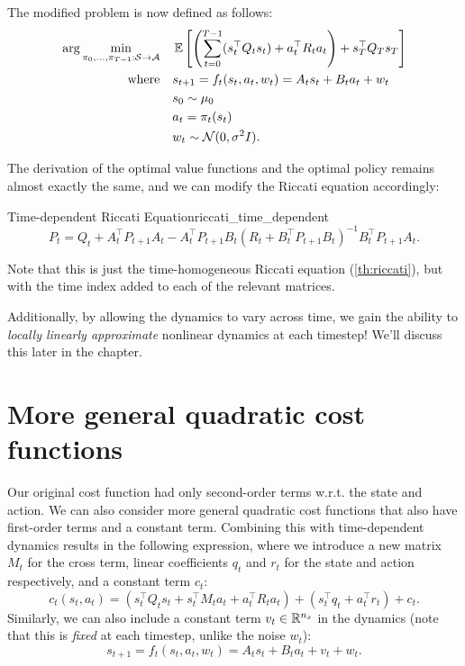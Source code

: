 \documentclass[../main/main]{subfiles}
\begin{document}
The modified problem is now defined as follows:
\begin{align*}
    \arg \min_{\pi_{0}, \dots, \pi_{T-1} : \mathcal{S} \to \mathcal{A}} \quad & \operatorname*{\mathbb{E}} \left[ \left( \sum_{t=0}^{T-1} (s_t^\top Q_t s_t) + a_t^\top R_t a_t \right) + s_T^\top Q_T s_T \right] \\
    \textrm{where} \quad & s_{t+1} = f_t(s_t, a_t, w_t) = A_t s_t + B_t a_t + w_t \\
    & s_0 \sim \mu_0 \\
    & a_t = \pi_t (s_t) \\
    & w_t \sim \mathcal{N}(0, \sigma^2 I).
\end{align*}

The derivation of the optimal value functions and the optimal policy remains almost exactly the same,
and we can modify the Riccati equation accordingly:

\begin{theorem}{Time-dependent Riccati Equation}{riccati_time_dependent}
    \[
        P_t = Q_t + A_t^\top P_{t+1} A_t - A_t^\top P_{t+1} B_t (R_t + B_t^\top P_{t+1} B_t)^{-1} B_t^\top P_{t+1} A_t.
    \]

    \noindent
    Note that this is just the time-homogeneous Riccati equation (\autoref{th:riccati}), but with the
    time index added to each of the relevant matrices.
\end{theorem}

Additionally, by allowing the dynamics to vary across time,
we gain the ability to \emph{locally linearly approximate} nonlinear dynamics at each timestep!
We'll discuss this later in the chapter.

\section{More general quadratic cost functions}

Our original cost function had only second-order terms w.r.t. the state and action. We can also consider more general quadratic cost functions that also have first-order terms and a constant term. Combining this with
time-dependent dynamics results in the following expression, where we introduce a new matrix $M_t$ for the cross term, linear coefficients $q_t$ and $r_t$ for the state and action respectively, and a constant term $c_t$:
\begin{equation}
    c_t(s_t, a_t) = ( s_t^\top Q_t s_t + s_t^\top M_t a_t + a_t^\top R_t a_t ) + (s_t^\top q_t + a_t^\top r_t) + c_t.
    \label{df:general_quadratic_cost}
\end{equation}
Similarly, we can also include a constant term $v_t \in \mathbb{R}^{n_s}$ in the dynamics (note that this is \emph{fixed} at each timestep, unlike the noise $w_t$):
\[
    s_{t+1} = f_t(s_t, a_t, w_t) = A_t s_t + B_t a_t + v_t + w_t.
\]
\end{document}
